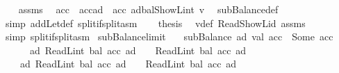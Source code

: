 \begin{isabellebody}
\ \ \isamarkupfalse%
\ assms\ \isamarkupfalse%
\ {\isachardoublequoteopen}acc{\isacharprime}{\kern0pt}\ {\isacharequal}{\kern0pt}\ acc{\isacharparenleft}{\kern0pt}ad\ {\isacharcolon}{\kern0pt}{\isacharequal}{\kern0pt}\ acc\ ad{\isasymlparr}bal{\isacharcolon}{\kern0pt}{\isacharequal}{\kern0pt}ShowL\isactrlsub i\isactrlsub n\isactrlsub t\ v{\isasymrparr}{\isacharparenright}{\kern0pt}{\isachardoublequoteclose}\ \isamarkupfalse%
\ subBalance{\isacharunderscore}{\kern0pt}def\ \isamarkupfalse%
\ {\isacharparenleft}{\kern0pt}simp\ add{\isacharcolon}{\kern0pt}Let{\isacharunderscore}{\kern0pt}def\ split{\isacharcolon}{\kern0pt}if{\isacharunderscore}{\kern0pt}split{\isacharunderscore}{\kern0pt}asm{\isacharparenright}{\kern0pt}\isanewline
\ \ \isamarkupfalse%
\ {\isacharquery}{\kern0pt}thesis\ \isamarkupfalse%
\ v{\isacharunderscore}{\kern0pt}def\ Read{\isacharunderscore}{\kern0pt}ShowL{\isacharunderscore}{\kern0pt}id\ assms\ \isamarkupfalse%
\ {\isacharparenleft}{\kern0pt}simp\ split{\isacharcolon}{\kern0pt}if{\isacharunderscore}{\kern0pt}split{\isacharunderscore}{\kern0pt}asm{\isacharparenright}{\kern0pt}\isanewline
{}\isamarkupfalse%
%
\endisatagproof
{\isafoldproof}%
%
\isadelimproof
\isanewline
%
\endisadelimproof
\isanewline
{}\isamarkupfalse%
\ subBalance{\isacharunderscore}{\kern0pt}limit{\isacharcolon}{\kern0pt}\isanewline
\ \ \ {\isachardoublequoteopen}subBalance\ ad\ val\ acc\ {\isacharequal}{\kern0pt}\ Some\ acc{\isacharprime}{\kern0pt}{\isachardoublequoteclose}\isanewline
\ \ \ \ \ \ {\isachardoublequoteopen}{\isasymforall}ad{\isachardot}{\kern0pt}\ ReadL\isactrlsub i\isactrlsub n\isactrlsub t\ {\isacharparenleft}{\kern0pt}bal\ {\isacharparenleft}{\kern0pt}acc\ ad{\isacharparenright}{\kern0pt}{\isacharparenright}{\kern0pt}\ {\isasymge}\ {}\ {\isasymand}\ ReadL\isactrlsub i\isactrlsub n\isactrlsub t\ {\isacharparenleft}{\kern0pt}bal\ {\isacharparenleft}{\kern0pt}acc\ ad{\isacharparenright}{\kern0pt}{\isacharparenright}{\kern0pt}\ {\isacharless}{\kern0pt}\ {}\ {\isacharcircum}{\kern0pt}\ {}{}{}{\isachardoublequoteclose}\isanewline
\ \ \ \ {\isachardoublequoteopen}{\isasymforall}ad{\isachardot}{\kern0pt}\ ReadL\isactrlsub i\isactrlsub n\isactrlsub t\ {\isacharparenleft}{\kern0pt}bal\ {\isacharparenleft}{\kern0pt}acc{\isacharprime}{\kern0pt}\ ad{\isacharparenright}{\kern0pt}{\isacharparenright}{\kern0pt}\ {\isasymge}\ {}\ {\isasymand}\ ReadL\isactrlsub i\isactrlsub n\isactrlsub t\ {\isacharparenleft}{\kern0pt}bal\ {\isacharparenleft}{\kern0pt}acc{\isacharprime}{\kern0pt}\ ad{\isacharparenright}{\kern0pt}{\isacharparenright}{\kern0pt}\ {\isacharless}{\kern0pt}\ {}\ {\isacharcircum}{\kern0pt}\ {}{}{}{\isachardoublequoteclose}\isanewline

\end{isabellebody}
